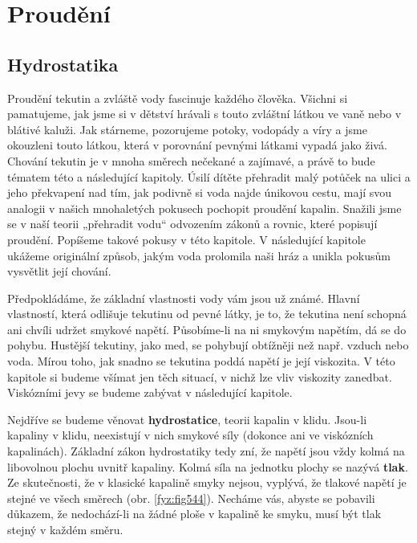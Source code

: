 \setchaptertoc
\chapter{Proudění }\label{fyz:IIchapXL}

  \section{Hydrostatika}\label{fyz:IIchapXLsecI}
    Proudění tekutin a zvláště vody fascinuje každého člověka. Všichni si pamatujeme, jak jsme si v 
    dětství hrávali s touto zvláštní látkou ve vaně nebo v blátivé kaluži. Jak stárneme, pozorujeme 
    potoky, vodopády a víry a jsme okouzleni touto látkou, která v porovnání pevnými látkami vypadá 
    jako živá. Chování tekutin je v mnoha směrech nečekané a zajímavé, a právě to bude tématem této 
    a následující kapitoly. Úsilí dítěte přehradit malý potůček na ulici a jeho překvapení nad tím, 
    jak podivně si voda najde únikovou cestu, mají svou analogii v našich mnohaletých pokusech 
    pochopit proudění kapalin. Snažili jsme se v naší teorii „přehradit vodu“ odvozením zákonů a 
    rovnic, které popisují proudění. Popíšeme takové pokusy v této kapitole. V následující kapitole 
    ukážeme originální způsob, jakým voda prolomila naši hráz a unikla pokusům vysvětlit její 
    chování.
    
    Předpokládáme, že základní vlastnosti vody vám jsou už známé. Hlavní vlastností, která odlišuje 
    tekutinu od pevné látky, je to, že tekutina není schopná ani chvíli udržet smykové napětí. 
    Působíme-li na ni smykovým napětím, dá se do pohybu. Hustější tekutiny, jako med, se pohybují 
    obtížněji než např. vzduch nebo voda. Mírou toho, jak snadno se tekutina poddá napětí je její 
    viskozita. V této kapitole si budeme všímat jen těch situací, v nichž lze vliv viskozity 
    zanedbat. Viskózními jevy se budeme zabývat v následující kapitole.
    
    Nejdříve se budeme věnovat \textbf{hydrostatice}, teorii kapalin v klidu. Jsou-li kapaliny v 
    klidu, neexistují v nich smykové síly (dokonce ani ve viskózních kapalinách). Základní zákon 
    hydrostatiky tedy zní, že napětí jsou vždy kolmá na libovolnou plochu uvnitř kapaliny. Kolmá 
    síla na jednotku plochy se nazývá \textbf{tlak}. Ze skutečnosti, že v klasické kapalině smyky 
    nejsou, vyplývá, že tlakové napětí je stejné ve všech směrech (obr. \ref{fyz:fig544}). Necháme 
    vás, abyste se pobavili důkazem, že nedochází-li na žádné ploše v kapalině ke smyku, musí být 
    tlak stejný v každém směru.
    
